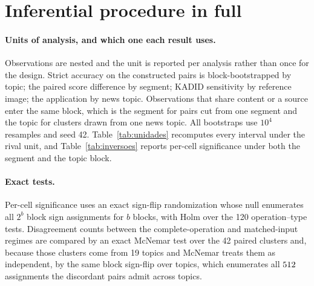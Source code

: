 \documentclass[sn-basic,Numbered]{sn-jnl}
\begin{document}
\clearpage


\clearpage


\clearpage


\clearpage


\clearpage


\clearpage




\clearpage



\clearpage


\clearpage


\clearpage


\clearpage


\clearpage


\clearpage


\clearpage




\clearpage
\section*{Inferential procedure in full}\label{sup:inference}

\paragraph{Units of analysis, and which one each result uses.} Observations are nested and
the unit is reported per analysis rather than once for the design. Strict accuracy on the
constructed pairs is block-bootstrapped by topic; the paired score difference by segment;
KADID sensitivity by reference image; the application by news topic. Observations that
share content or a source enter the same block, which is the segment for pairs cut from
one segment and the topic for clusters drawn from one news topic. All bootstraps use
$10^4$ resamples and seed 42. Table~\ref{tab:unidades} recomputes every interval under the
rival unit, and Table~\ref{tab:inversoes} reports per-cell significance under both the
segment and the topic block.

\paragraph{Exact tests.} Per-cell significance uses an exact sign-flip randomization whose
null enumerates all $2^{b}$ block sign assignments for $b$ blocks, with Holm over the 120
operation--type tests. Disagreement counts between the complete-operation and
matched-input regimes are compared by an exact McNemar test over the 42 paired clusters
and, because those clusters come from 19 topics and McNemar treats them as independent, by
the same block sign-flip over topics, which enumerates all $512{}$ assignments the
discordant pairs admit across \mcnBlocos{} topics.
\end{document}
